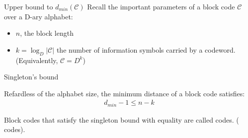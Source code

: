 \begin{parag}{Upper bound to $d_{min}\left(\mathcal{C}\right)$}
    Recall the important parameters of a block code $\mathcal{C}$ over a D-ary alphabet:
    \begin{itemize}
        \item $n$, the block length
        \item $k =  \log_D \left|\mathcal{C}\right|$ the number of information symbols carried by a codeword. (Equivalently, $\mathcal{C} = D^k$)
    \end{itemize}

\end{parag}
\begin{parag}{Singleton's bound}
    

    \begin{theoreme}
    Refardless of the alphabet size, the minimum distance of a block code satisfies:
    \begin{align*} d_{min} - 1 \leq n-k \end{align*}
    \end{theoreme}
    Block codes that satisfy the singleton bound with equality are called  codes. ( codes).
\end{parag}
